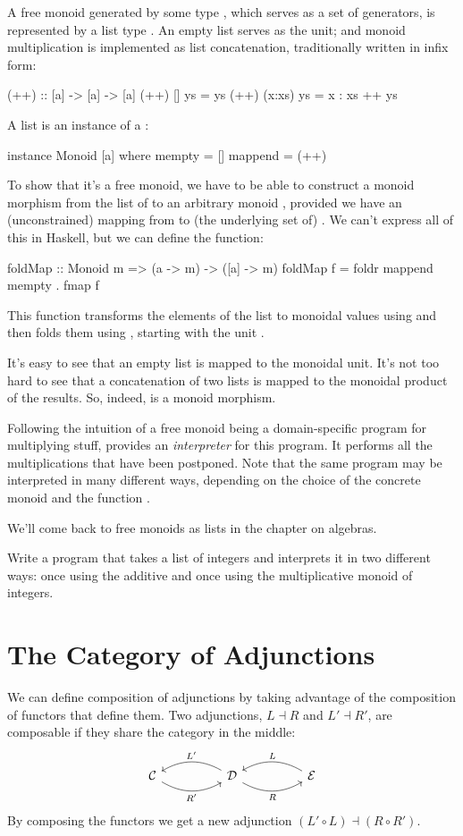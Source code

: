 \documentclass[DaoFP]{subfiles}
\begin{document}
A free monoid generated by some type , which serves as a set of generators, is represented by a list type \hask{[a]}. An empty list serves as the unit; and monoid multiplication is implemented as list concatenation, traditionally written in infix form:
\begin{haskell}
(++) :: [a] -> [a] -> [a]
(++) []     ys = ys
(++) (x:xs) ys = x : xs ++ ys
\end{haskell}
A list is an instance of a :
\begin{haskell}
instance Monoid [a] where
  mempty = []
  mappend = (++)
\end{haskell}

To show that it's a free monoid, we have to be able to construct a monoid morphism from the list of  to an arbitrary monoid , provided we have an (unconstrained) mapping from  to (the underlying set of) . We can't express all of this in Haskell, but we can define the function:
\begin{haskell}
foldMap :: Monoid m => (a -> m) -> ([a] -> m)
foldMap f = foldr mappend mempty . fmap f
\end{haskell}
This function transforms the elements of the list to monoidal values using  and then folds them using , starting with the unit . 

It's easy to see that an empty list is mapped to the monoidal unit. It's not too hard to see that a concatenation of two lists is mapped to the monoidal product of the results. So, indeed,  is a monoid morphism. 

Following the intuition of a free monoid being a domain-specific program for multiplying stuff,  provides an \emph{interpreter} for this program. It performs all the multiplications that have been postponed. Note that the same program may be interpreted in many different ways, depending on the choice of the concrete monoid and the function .

We'll come back to free monoids as lists in the chapter on algebras.

\begin{exercise}
Write a program that takes a list of integers and interprets it in two different ways: once using the additive and once using the multiplicative monoid of integers.
\end{exercise}

\section{The Category of Adjunctions}
We can define composition of adjunctions by taking advantage of the composition of functors that define them. Two adjunctions, $L \dashv R$ and $L' \dashv R'$, are composable if they share the category in the middle:
\[
 \begin{tikzcd}
  \mathcal{C}
  \arrow[rr, bend right, "R'"']
  &&
  \mathcal{D}
  \arrow[ll, bend right, "L'"']
    \arrow[rr, bend right, "R"']
&&
  \mathcal{E}
  \arrow[ll, bend right, "L"']
 \end{tikzcd}
\]
By composing the functors we get a new adjunction $(L' \circ L) \dashv (R \circ R')$. 
\end{document}
